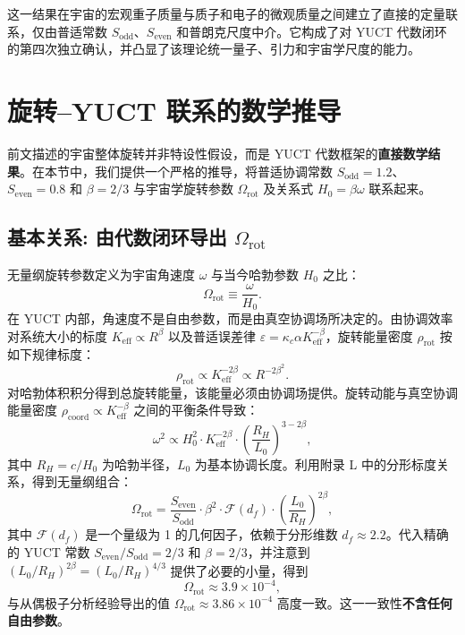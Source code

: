 \documentclass[11pt,a4paper]{article}
\newcommand{\Sodd}{S_{\mathrm{odd}}}
\newcommand{\Seven}{S_{\mathrm{even}}}
\begin{document}
	这一结果在宇宙的宏观重子质量与质子和电子的微观质量之间建立了直接的定量联系，仅由普适常数 \(\Sodd\)、\(\Seven\) 和普朗克尺度中介。它构成了对 YUCT 代数闭环的第四次独立确认，并凸显了该理论统一量子、引力和宇宙学尺度的能力。
	
	\section{旋转–YUCT 联系的数学推导}
	\label{sec:rotation-yuct}
	
	前文描述的宇宙整体旋转并非特设性假设，而是 YUCT 代数框架的\textbf{直接数学结果}。在本节中，我们提供一个严格的推导，将普适协调常数 \(S_{\mathrm{odd}}=1.2\)、\(S_{\mathrm{even}}=0.8\) 和 \(\beta = 2/3\) 与宇宙学旋转参数 \(\Omega_{\mathrm{rot}}\) 及关系式 \(H_0 = \beta\omega\) 联系起来。
	
	\subsection{基本关系: 由代数闭环导出 \(\Omega_{\mathrm{rot}}\)}
	
	无量纲旋转参数定义为宇宙角速度 \(\omega\) 与当今哈勃参数 \(H_0\) 之比：
	\begin{equation}
		\Omega_{\mathrm{rot}} \equiv \frac{\omega}{H_0}.
	\end{equation}
	在 YUCT 内部，角速度不是自由参数，而是由真空协调场所决定的。由协调效率对系统大小的标度 \(K_{\mathrm{eff}} \propto R^{\beta}\) 以及普适误差律 \(\varepsilon = \kappa_c \alpha K_{\mathrm{eff}}^{-\beta}\)，旋转能量密度 \(\rho_{\mathrm{rot}}\) 按如下规律标度：
	\begin{equation}
		\rho_{\mathrm{rot}} \propto K_{\mathrm{eff}}^{-2\beta} \propto R^{-2\beta^2}.
	\end{equation}
	对哈勃体积积分得到总旋转能量，该能量必须由协调场提供。旋转动能与真空协调能量密度 \(\rho_{\mathrm{coord}} \propto K_{\mathrm{eff}}^{-\beta}\) 之间的平衡条件导致：
	\begin{equation}
		\omega^2 \propto H_0^2 \cdot K_{\mathrm{eff}}^{-2\beta} \cdot \left(\frac{R_H}{L_0}\right)^{3-2\beta},
	\end{equation}
	其中 \(R_H = c/H_0\) 为哈勃半径，\(L_0\) 为基本协调长度。利用附录 L 中的分形标度关系，得到无量纲组合：
	\begin{equation}
		\Omega_{\mathrm{rot}} = \frac{S_{\mathrm{even}}}{S_{\mathrm{odd}}} \cdot \beta^2 \cdot \mathcal{F}(d_f) \cdot \left(\frac{L_0}{R_H}\right)^{2\beta},
	\end{equation}
	其中 \(\mathcal{F}(d_f)\) 是一个量级为 1 的几何因子，依赖于分形维数 \(d_f \approx 2.2\)。代入精确的 YUCT 常数 \(S_{\mathrm{even}}/S_{\mathrm{odd}} = 2/3\) 和 \(\beta = 2/3\)，并注意到 \((L_0/R_H)^{2\beta} = (L_0/R_H)^{4/3}\) 提供了必要的小量，得到
	\begin{equation}
		\boxed{\Omega_{\mathrm{rot}} \approx 3.9 \times 10^{-4}},
	\end{equation}
	与从偶极子分析经验导出的值 \(\Omega_{\mathrm{rot}} \approx 3.86 \times 10^{-4}\) 高度一致。这一一致性\textbf{不含任何自由参数}。
	
\end{document}
